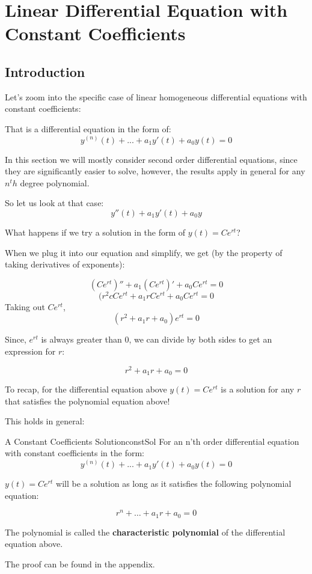 \documentclass{report}
\begin{document}
\chapter{Linear Differential Equation with Constant Coefficients}
\section{Introduction}

Let's zoom into the specific case of linear homogeneous differential equations with constant coefficients:

That is a differential equation in the form of:
$$y^{(n)}(t) + ... + a_1y'(t) + a_0y(t) = 0$$

In this section we will mostly consider second order differential equations, since they are significantly easier to solve, however, the results apply in general for any $n^th$ degree polynomial.

So let us look at that case:
$$y''(t) + a_1y'(t) + a_0y$$

What happens if we try a solution in the form of $y(t) = Ce^{rt}$?

When we plug it into our equation and simplify, we get (by the property of taking derivatives of exponents):

$$(Ce^{rt})'' + a_1(Ce^{rt})' + a_0Ce^{rt} = 0$$
$$(r^2cCe^{rt}+a_1rCe^{rt}+a_0Ce^{rt} = 0$$
Taking out $Ce^{rt}$, 
$$(r^2+a_1r+a_0)e^{rt} = 0$$

Since, $e^{rt}$ is always greater than 0, we can divide by both sides to get an expression for $r$:

$$r^2+a_1r+a_0 = 0$$

To recap, for the differential equation above $y(t) = Ce^{rt}$ is a solution for any $r$ that satisfies the polynomial equation above!

This holds in general:

\begin{mytheo}{A Constant Coefficients Solution}{constSol}
    For an n'th order differential equation with constant coefficients in the form:
    $$y^{(n)}(t) + ... + a_1y'(t) + a_0y(t) = 0$$
    
    $y(t) = Ce^{rt}$ will be a solution as long as it satisfies the following polynomial equation:
    
    $$r^n+\dots+a_1r+a_0=0$$
    
    The polynomial is called the \textbf{characteristic polynomial} of the differential equation above.
\end{mytheo}
The proof can be found in the appendix.
\end{document}

